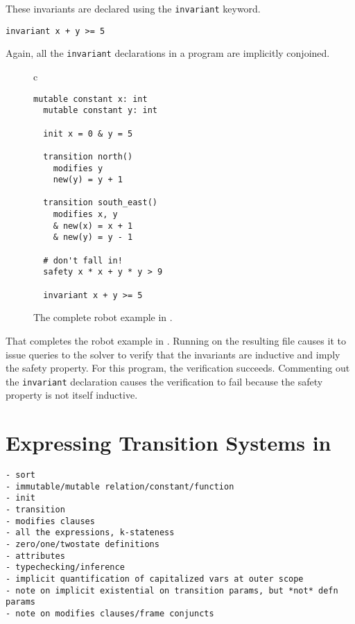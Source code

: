 These invariants are declared using the \lstinline[language=mypyvy]{invariant} keyword.
\begin{lstlisting}[language=mypyvy, xleftmargin=.2\textwidth, xrightmargin=.2\textwidth]
invariant x + y >= 5
\end{lstlisting}
Again, all the \lstinline[language=mypyvy]{invariant} declarations in a program are 
  implicitly conjoined. 

\begin{figure}[t]
  \centering
  \begin{center}
  \begin{tabular}{c}
  \begin{lstlisting}[language=mypyvy]
  mutable constant x: int
  mutable constant y: int
  
  init x = 0 & y = 5
  
  transition north()
    modifies y
    new(y) = y + 1
  
  transition south_east()
    modifies x, y
    & new(x) = x + 1
    & new(y) = y - 1
  
  # don't fall in!
  safety x * x + y * y > 9
  
  invariant x + y >= 5
  \end{lstlisting}
  \end{tabular}
  \end{center}
  \caption{The complete robot example in \mypyvy.}
  \label{fig:robot-mypyvy}
\end{figure}
That completes the robot example in \mypyvy.
Running \mypyvy on the resulting file causes it to 
  issue queries to the solver to verify that the invariants 
  are inductive and imply the safety property.
For this program, the verification succeeds.
Commenting out the \lstinline[language=mypyvy]{invariant} declaration
  causes the verification to fail 
  because the safety property is not itself inductive.


\section{Expressing Transition Systems in \mypyvy}

\begin{verbatim}
- sort
- immutable/mutable relation/constant/function
- init
- transition
- modifies clauses
- all the expressions, k-stateness
- zero/one/twostate definitions
- attributes
- typechecking/inference
- implicit quantification of capitalized vars at outer scope
- note on implicit existential on transition params, but *not* defn params
- note on modifies clauses/frame conjuncts
\end{verbatim}

